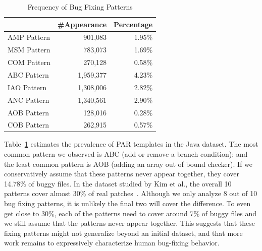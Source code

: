 \documentclass{sig-alternate-05-2015}
\begin{document}
\begin{table}[!htb]
	\centering
	\begin{tabular}{lrr} 
		\hline
		& \textbf{\#Appearance} & \textbf{Percentage}\\
		\hline
		AMP Pattern & 901,083 & 1.95\%\\
		MSM Pattern & 783,073 & 1.69\%\\
		COM Pattern & 270,128 & 0.58\%\\ 
		ABC Pattern & 1,959,377 & 4.23\%\\  
		IAO Pattern & 1,308,006 & 2.82\%\\  
		ANC Pattern & 1,340,561 & 2.90\%\\  
		AOB Pattern & 128,016 & 0.28\%\\  
		COB Pattern & 262,915 & 0.57\%\\   
		\hline
	\end{tabular}
	\caption{Frequency of Bug Fixing Patterns}\label{tab:freqpattern}
	
\end{table}


Table~\ref{tab:freqpattern} estimates the prevalence of PAR templates in the
Java dataset. The most common pattern we observed is ABC (add or remove a branch condition); and the least common
pattern is AOB (adding an array out of bound checker). If we conservatively assume that these patterns never appear together, they
cover 14.78\% of buggy files. In the dataset studied by Kim et al., the overall
10 patterns cover almost 30\% of real patches~\cite{kim2013}. Although we only analyze 8
out of 10 bug fixing patterns, it is unlikely the final two will cover the
difference. To even get close to 30\%, each of the patterns need to cover around 7\% of buggy files and we still assume that the patterns never appear together. 
This suggests that these fixing patterns might not generalize
beyond an initial dataset, and that more work remains to expressively characterize human bug-fixing behavior.
\end{document}
